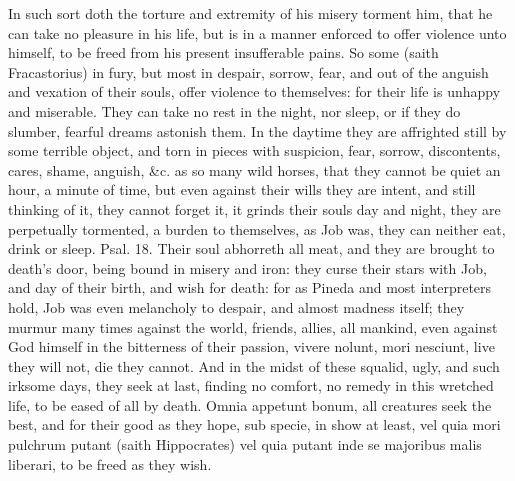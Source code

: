 In such sort doth the torture and extremity of his misery torment him,
that he can take no pleasure in his life, but is in a manner enforced
to offer violence unto himself, to be freed from his present
insufferable pains. So some (saith Fracastorius) in fury, but
most in despair, sorrow, fear, and out of the anguish and vexation of
their souls, offer violence to themselves: for their life is unhappy
and miserable. They can take no rest in the night, nor sleep, or if
they do slumber, fearful dreams astonish them. In the daytime they are
affrighted still by some terrible object, and torn in pieces with
suspicion, fear, sorrow, discontents, cares, shame, anguish, \&c. as so
many wild horses, that they cannot be quiet an hour, a minute of time,
but even against their wills they are intent, and still thinking of it,
they cannot forget it, it grinds their souls day and night, they are
perpetually tormented, a burden to themselves, as Job was, they can
neither eat, drink or sleep. Psal.  18. Their soul abhorreth all
meat, and they are brought to death's door, being bound in misery
and iron: they curse their stars with Job, and day of their
birth, and wish for death: for as Pineda and most interpreters hold,
Job was even melancholy to despair, and almost madness itself;
they murmur many times against the world, friends, allies, all mankind,
even against God himself in the bitterness of their passion,
vivere nolunt, mori nesciunt, live they will not, die they
cannot. And in the midst of these squalid, ugly, and such irksome days,
they seek at last, finding no comfort, no remedy in this wretched
life, to be eased of all by death. Omnia appetunt bonum, all creatures
seek the best, and for their good as they hope, sub specie, in show at
least, vel quia mori pulchrum putant (saith Hippocrates) vel quia
putant inde se majoribus malis liberari, to be freed as they wish.

